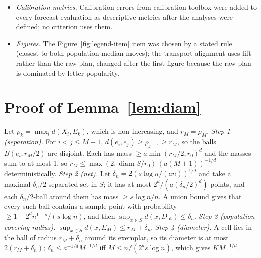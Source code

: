 \documentclass[11pt]{article}
\theoremstyle{definition}
\theoremstyle{remark}
\newcommand{\Dfit}{D_{\mathrm{fit}}}
\newcommand{\1}{\mathbf{1}}
\DeclareMathOperator{\diam}{diam}
\newcommand{\expname}[1]{\textsc{#1}}
\begin{document}
\begin{itemize}
  were designed after the TruthfulQA results were known, in particular after the TruthfulQA family of
  group-versus-recalibration tests had returned no significant result. \expname{PopQA-Elicit} declared its own
  Holm family (three models $\times$ five budgets; one rejection, Mistral at 2{,}396 labels, adjusted
  $p=0.047$). Treating the two datasets as one registered question tested 27 times, no test survives
  (smallest Holm-adjusted $p=0.085$). \expname{PopQA-Elicit} re-elicits PopQA under the
  frozen TruthfulQA templates; before any label was joined its batch size was changed from 32 to 1
  because a padding check failed (differences up to $0.016$), and a loader error that would have read
  the TruthfulQA reports was caught (it failed loudly) and fixed before any analysis ran.
  \item \emph{Calibration metrics.} Calibration errors from calibration-toolbox were added to every
  forecast evaluation as descriptive metrics after the analyses were defined; no criterion uses them.
  \item \emph{Figures.} The Figure~\ref{fig:legend-item} item was chosen by a stated rule (closest to
  both population median moves); the transport alignment uses lift rather than the raw plan, changed
  after the first figure because the raw plan is dominated by letter popularity.
\end{itemize}

\section{Proof of Lemma~\ref{lem:diam}}
\label{app:lemma}
Let $\rho_k=\max_i d(X_i,E_k)$, which is non-increasing, and $r_M=\rho_M$.
\emph{Step 1 (separation).} For $i<j\le M+1$, $d(e_i,e_j)\ge\rho_{j-1}\ge r_M$, so the balls
$B(e_i,r_M/2)$ are disjoint. Each has mass $\ge a\min(r_M/2,r_0)^d$ and the masses sum to at most
1, so $r_M\le\max(2,\diam S/r_0)\,(a(M+1))^{-1/d}$ deterministically.
\emph{Step 2 (net).} Let $\delta_n=2(s\log n/(an))^{1/d}$ and take a maximal $\delta_n/2$-separated
set in $S$; it has at most $2^d/(a(\delta_n/2)^d)$ points, and each $\delta_n/2$-ball around them has
mass $\ge s\log n/n$. A union bound gives that every such ball contains a sample point with
probability $\ge1-2^dn^{1-s}/(s\log n)$, and then $\sup_{x\in S}d(x,\Dfit)\le\delta_n$.
\emph{Step 3 (population covering radius).} $\sup_{x\in S}d(x,E_M)\le r_M+\delta_n$.
\emph{Step 4 (diameter).} A cell lies in the ball of radius $r_M+\delta_n$ around its exemplar, so its
diameter is at most $2(r_M+\delta_n)$; $\delta_n\le a^{-1/d}M^{-1/d}$ iff $M\le n/(2^ds\log n)$, which
gives $KM^{-1/d}$. \hfill$\square$
\end{document}
